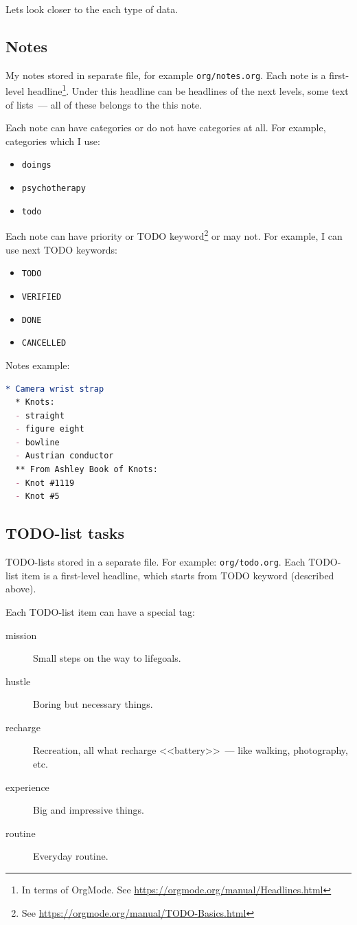 \documentclass[a4paper,12pt,oneside]{scrartcl}
\begin{document}
Lets look closer to the each type of data.

\subsection{Notes}
\label{sec:notes}

My notes stored in separate file, for example \texttt{org/notes.org}. Each note
is a first-level headline\footnote{In terms of OrgMode. See
  \url{https://orgmode.org/manual/Headlines.html}}. Under this headline can be
headlines of the next levels, some text of lists~--- all of these belongs to
the this note.

Each note can have categories or do not have categories at all. For example,
categories which I use:
\begin{itemize}
\item \texttt{doings}
\item \texttt{psychotherapy}
\item \texttt{todo}
\end{itemize}

Each note can have priority or TODO keyword\footnote{See
  \url{https://orgmode.org/manual/TODO-Basics.html}} or may not. For example, I
can use next TODO keywords:
\begin{itemize}
\item \texttt{TODO}
\item \texttt{VERIFIED}
\item \texttt{DONE}
\item \texttt{CANCELLED}
\end{itemize}

Notes example:
\begin{lstlisting}[language=org]
  * Camera wrist strap
  * Knots:
  - straight
  - figure eight
  - bowline
  - Austrian conductor
  ** From Ashley Book of Knots:
  - Knot #1119
  - Knot #5
\end{lstlisting}

\subsection{TODO-list tasks}
\label{sec:todo-list-tasks}

TODO-lists stored in a separate file. For example: \texttt{org/todo.org}. Each
TODO-list item is a first-level headline, which starts from TODO keyword
(described above).

Each TODO-list item can have a special tag:
\begin{description}
\item[mission] Small steps on the way to lifegoals.
\item[hustle] Boring but necessary things.
\item[recharge] Recreation, all what recharge <<battery>>~--- like walking,
  photography, etc.
\item[experience] Big and impressive things.
\item[routine] Everyday routine.
\end{description}
\end{document}
